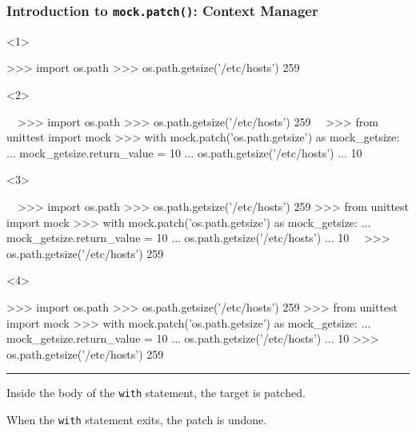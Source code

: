 \documentclass[xcolor={svgnames}]{beamer}
\newcommand{\ttcode}[2][]{\lstinline[style=plain,basicstyle=\ttfamily#1]{#2}}
\newcommand{\pycode}[2][]{\lstinline[style=python,#1]{#2}}
\newcommand{\hr}[2]{\vspace{#1}\hrule height 0.01mm\vspace{#2}}
\begin{document}
\begin{frame}[t,fragile]
    \frametitle{Introduction to \ttcode{mock.patch()}: Context Manager}
    \begin{onlyenv}<1>
        \begin{pyenv}[gobble=12]
            >>> import os.path
            >>> os.path.getsize('/etc/hosts')
            259
        \end{pyenv}
    \end{onlyenv}
    \begin{onlyenv}<2>
        \begin{pyenv}[gobble=12]
            ~~>>> import os.path
            >>> os.path.getsize('/etc/hosts')
            259~~
            >>> from unittest import mock
            >>> with mock.patch('os.path.getsize') as mock_getsize:
            ...     mock_getsize.return_value = 10
            ...     os.path.getsize('/etc/hosts')
            ...
            10
        \end{pyenv}
    \end{onlyenv}
    \begin{onlyenv}<3>
        \begin{pyenv}[gobble=12]
            ~~>>> import os.path
            >>> os.path.getsize('/etc/hosts')
            259
            >>> from unittest import mock
            >>> with mock.patch('os.path.getsize') as mock_getsize:
            ...     mock_getsize.return_value = 10
            ...     os.path.getsize('/etc/hosts')
            ...
            10~~
            >>> os.path.getsize('/etc/hosts')
            259
        \end{pyenv}
    \end{onlyenv}
    \begin{onlyenv}<4>
        \begin{pyenv}[gobble=12]
            >>> import os.path
            >>> os.path.getsize('/etc/hosts')
            259
            >>> from unittest import mock
            >>> with mock.patch('os.path.getsize') as mock_getsize:
            ...     mock_getsize.return_value = 10
            ...     os.path.getsize('/etc/hosts')
            ...
            10
            >>> os.path.getsize('/etc/hosts')
            259
        \end{pyenv}

        \hr{1mm}{1mm}

        Inside the body of the \pycode{with} statement, the target is
        patched.

        When the \pycode{with} statement exits, the patch is undone.
    \end{onlyenv}
\end{frame}
\end{document}
